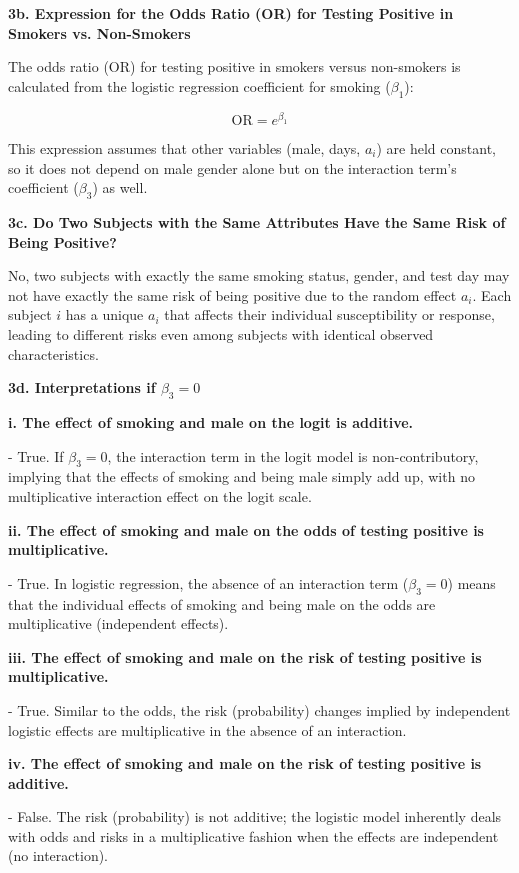 \documentclass{article}
\begin{document}
\textbf{3b. Expression for the Odds Ratio (OR) for Testing Positive in Smokers vs. Non-Smokers}

The odds ratio (OR) for testing positive in smokers versus non-smokers is calculated from the logistic regression coefficient for smoking (\(\beta_1\)):

\[ \text{OR} = e^{\beta_1} \]

This expression assumes that other variables (male, days, \(a_i\)) are held constant, so it does not depend on male gender alone but on the interaction term's coefficient (\(\beta_3\)) as well.

\textbf{3c. Do Two Subjects with the Same Attributes Have the Same Risk of Being Positive?}

No, two subjects with exactly the same smoking status, gender, and test day may not have exactly the same risk of being positive due to the random effect \(a_i\). Each subject \(i\) has a unique \(a_i\) that affects their individual susceptibility or response, leading to different risks even among subjects with identical observed characteristics.

\textbf{3d. Interpretations if \(\beta_3 = 0\)}

\textbf{i. The effect of smoking and male on the logit is additive.}

  - True. If \(\beta_3 = 0\), the interaction term in the logit model is non-contributory, implying that the effects of smoking and being male simply add up, with no multiplicative interaction effect on the logit scale.

\textbf{ii. The effect of smoking and male on the odds of testing positive is multiplicative.}

  - True. In logistic regression, the absence of an interaction term (\(\beta_3 = 0\)) means that the individual effects of smoking and being male on the odds are multiplicative (independent effects).

\textbf{iii. The effect of smoking and male on the risk of testing positive is multiplicative.}

  - True. Similar to the odds, the risk (probability) changes implied by independent logistic effects are multiplicative in the absence of an interaction.

\textbf{iv. The effect of smoking and male on the risk of testing positive is additive.}

  - False. The risk (probability) is not additive; the logistic model inherently deals with odds and risks in a multiplicative fashion when the effects are independent (no interaction).
\end{document}
